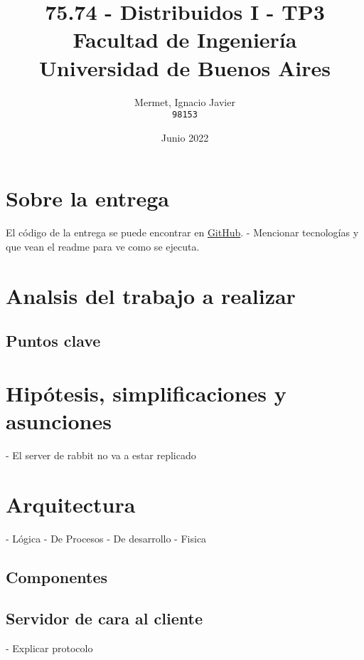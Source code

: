 \documentclass[titlepage,a4paper,oneside]{article}
\begin{document}
\begin{titlepage}
\title{
	75.74 \-- Distribuidos I \-- TP3\\
    \large Facultad de Ingeniería\\
	Universidad de Buenos Aires
}
\author{
	Mermet, Ignacio Javier\\
	\texttt{98153}
}
\date{Junio 2022}

\maketitle

\end{titlepage}

\tableofcontents

\newpage

\section{Sobre la entrega}
El código de la entrega se puede encontrar en \href{https://github.com/CrossNox/7574-TP3}{GitHub}.
- Mencionar tecnologías y que vean el readme para ve como se ejecuta.

\section{Analsis del trabajo a realizar}

\subsection{Puntos clave}

\section{Hipótesis, simplificaciones y asunciones}
- El server de rabbit no va a estar replicado

\section{Arquitectura}
- Lógica
- De Procesos
- De desarrollo
- Fisica

\subsection{Componentes}

\subsection{Servidor de cara al cliente}
- Explicar protocolo
\end{document}
